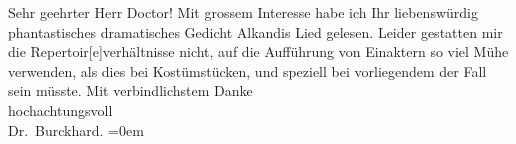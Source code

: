\begin{ledgroupsized}[t]{13cm}
           \pstart\center{}Sehr geehrter Herr Doctor!\pend\pstart
           Mit grossem Interesse habe ich Ihr liebenswürdig phantastisches dramatisches Gedicht
                  Alkandis Lied gelesen. Leider gestatten mir
               die Repertoir{[}e{]}verhältnisse nicht, auf die Aufführung von
               Einaktern so viel Mühe \label{T_L00024-1v}\label{T_L00024-1h}
               verwenden, als dies bei Kostümstücken, und speziell bei vorliegendem der Fall sein
               müsste.\pend
           \pstart
           Mit verbindlichstem Danke{\\[\baselineskip]}hochachtungsvoll{\\[\baselineskip]}\spacefill\mbox{Dr. Burckhard.}\pend
           \leftskip=0em{}
         
         \endnumbering{}\end{ledgroupsized}  \newcommand{\dateiname}{L00024}\newcommand{\titel}{Max Burckhard an Arthur Schnitzler, 14. 7. 1891}\newcommand{\editorInnen}{Martin Anton Müller und Gerd-Hermann Susen}
      